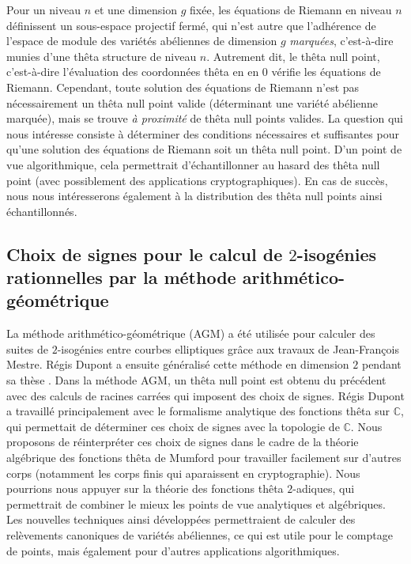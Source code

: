 \documentclass[a4paper,10pt]{scrartcl}
\theoremstyle{definition}
\theoremstyle{plain}
\theoremstyle{definition}
\def\C{\mathbb{C}}
\renewcommand{\(}{\left(}
\renewcommand{\)}{\right)}
\begin{document}
Pour un niveau $n$ et une dimension $g$ fixée, les équations de Riemann en niveau $n$ définissent un sous-espace projectif fermé, qui n'est autre que l'adhérence de l'espace de module des variétés abéliennes de dimension $g$ \emph{marquées}, c'est-à-dire munies d'une thêta structure de niveau $n$. Autrement dit, le thêta null point, c'est-à-dire l'évaluation des coordonnées thêta en en $0$ vérifie les équations de Riemann. Cependant, toute solution des équations de Riemann n'est pas nécessairement un thêta null point valide (déterminant une variété abélienne marquée), mais se trouve \emph{à proximité} de thêta null points valides. La question qui nous intéresse consiste à déterminer des conditions nécessaires et suffisantes pour qu'une solution des équations de Riemann soit un thêta null point. D'un point de vue algorithmique, cela permettrait d'échantillonner au hasard des thêta null point (avec possiblement des applications cryptographiques). En cas de succès, nous nous intéresserons également à la distribution des thêta null points ainsi échantillonnés.

\subsection{Choix de signes pour le calcul de $2$-isogénies rationnelles par la méthode arithmético-géométrique}

La méthode arithmético-géométrique (AGM) a été utilisée pour calculer des suites de $2$-isogénies entre courbes elliptiques grâce aux travaux de Jean-François Mestre. Régis Dupont a ensuite généralisé cette méthode en dimension $2$ pendant sa thèse \cite{Dupont_thesis}. Dans la méthode AGM, un thêta null point est obtenu du précédent avec des calculs de racines carrées qui imposent des choix de signes. Régis Dupont a travaillé principalement avec le formalisme analytique des fonctions thêta sur $\C$, qui permettait de déterminer ces choix de signes avec la topologie de $\C$. Nous proposons de réinterpréter ces choix de signes dans le cadre de la théorie algébrique des fonctions thêta de Mumford pour travailler facilement sur d'autres corps (notamment les corps finis qui aparaissent en cryptographie). Nous pourrions nous appuyer sur la théorie des fonctions thêta $2$-adiques, qui permettrait de combiner le mieux les points de vue analytiques et algébriques. Les nouvelles techniques ainsi développées permettraient de calculer des relèvements canoniques de variétés abéliennes, ce qui est utile pour le comptage de points, mais également pour d'autres applications algorithmiques.    
\end{document}
